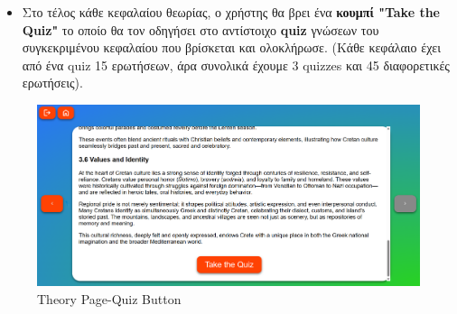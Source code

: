 \begin{itemize}
    \item Στο τέλος κάθε κεφαλαίου θεωρίας, ο χρήστης θα βρει ένα \textbf{κουμπί \textlatin{"Take the Quiz"}} το οποίο θα τον οδηγήσει στο αντίστοιχο \textlatin{\textbf{quiz}} γνώσεων του συγκεκριμένου κεφαλαίου που βρίσκεται και ολοκλήρωσε. (Κάθε κεφάλαιο έχει από ένα \textlatin{quiz} 15 ερωτήσεων, άρα συνολικά έχουμε 3 \textlatin{quizzes} και 45 διαφορετικές ερωτήσεις).
\end{itemize}
\begin{figure}[H]
    \centering
    \includegraphics[width=1\linewidth]{img/Theory-TestButton.png}
    \caption{\textlatin{Theory Page-Quiz Button}}
\end{figure}
 

